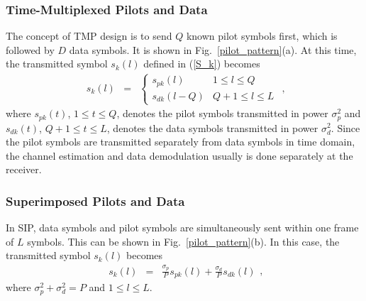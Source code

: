 \documentclass[10pt,fleqn, twocolumn]{IEEEtran}
\begin{document}
\subsubsection{Time-Multiplexed Pilots and Data}
The concept of TMP design is to send $Q$ known pilot symbols
first, which is followed by $D$ data symbols. It is shown in
Fig.~\ref{pilot_pattern}(a). At this time, the transmitted symbol
$s_{k}(l)$ defined in (\ref{S_k}) becomes
\begin{equation}
\begin{array}{rcl}
s_{k}\left(l\right)&=&
\begin{cases}
s_{pk}(l) & 1 \leq l \leq Q \\
s_{dk}(l-Q) & Q+1\leq l\leq L
\end{cases}
\end{array},\label{TMP_k}
\end{equation}
\noindent where $s_{pk}(t)$, $1\leq t \leq Q$, denotes the pilot
symbols transmitted in power $\sigma_{p}^2$ and $s_{dk}(t)$,
$Q+1\leq t \leq L$, denotes the data symbols transmitted in power
$\sigma_{d}^2$. Since the pilot symbols are transmitted separately
from data symbols in time domain, the channel estimation and data
demodulation usually is done separately at the receiver.
\subsubsection{Superimposed Pilots and Data}
In SIP, data symbols and pilot symbols are simultaneously sent
within one frame of $L$ symbols. This can be shown in
Fig.~\ref{pilot_pattern}(b). In this case, the transmitted symbol
$s_{k}(l)$ becomes
\begin{equation}
\begin{array}{rcl}
s_{k}\left(l\right)&=&\frac{\sigma_{p}}{P}s_{pk}\left(l\right)+\frac{\sigma_{d}}{P}s_{dk}\left(l\right)
\end{array},\label{SIP_k}
\end{equation}
\noindent where $\sigma_{p}^2+\sigma_{d}^2=P$ and $1\leq l\leq L$.
\end{document}
